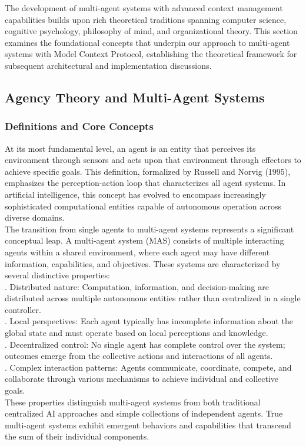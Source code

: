 The development of multi-agent systems with advanced context management capabilities builds upon rich theoretical traditions spanning computer science, cognitive psychology, philosophy of mind, and organizational theory. This section examines the foundational concepts that underpin our approach to multi-agent systems with Model Context Protocol, establishing the theoretical framework for subsequent architectural and implementation discussions.\\
\subsection{Agency Theory and Multi-Agent Systems}
\subsubsection{Definitions and Core Concepts}
At its most fundamental level, an agent is an entity that perceives its environment through sensors and acts upon that environment through effectors to achieve specific goals. This definition, formalized by Russell and Norvig (1995), emphasizes the perception-action loop that characterizes all agent systems. In artificial intelligence, this concept has evolved to encompass increasingly sophisticated computational entities capable of autonomous operation across diverse domains.\\ \newline
The transition from single agents to multi-agent systems represents a significant conceptual leap. A multi-agent system (MAS) consists of multiple interacting agents within a shared environment, where each agent may have different information, capabilities, and objectives. These systems are characterized by several distinctive properties:\\ . Distributed nature: Computation, information, and decision-making are distributed across multiple autonomous entities rather than centralized in a single controller.\\ . Local perspectives: Each agent typically has incomplete information about the global state and must operate based on local perceptions and knowledge.\\ . Decentralized control: No single agent has complete control over the system; outcomes emerge from the collective actions and interactions of all agents.\\ . Complex interaction patterns: Agents communicate, coordinate, compete, and collaborate through various mechanisms to achieve individual and collective goals.\\ \newline
These properties distinguish multi-agent systems from both traditional centralized AI approaches and simple collections of independent agents. True multi-agent systems exhibit emergent behaviors and capabilities that transcend the sum of their individual components.\\
